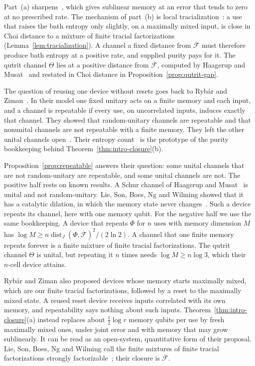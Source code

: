 Part~(a) sharpens~\cite[Corollary~3.3(c)]{DouglasMghirbiB}, which gives
sublinear memory at an error that tends to zero at no prescribed rate.
The mechanism of part~(b) is local
tracialization~\cite[Lemma~5.4]{DouglasMghirbiB}: a use that raises the
bath entropy only slightly, on a maximally mixed input, is close in
Choi distance to a mixture of finite tracial factorizations
(Lemma~\ref{lem:tracialization}). A channel a fixed distance from
$\overline{\mathcal F}$ must therefore produce bath entropy at a
positive rate, and supplied purity pays for it. The qutrit channel
$\Theta$ lies at a positive distance from $\overline{\mathcal F}$,
computed by Haagerup and Musat~\cite[Theorem~5.6 and
Corollary~5.7]{HaagerupMusat2015} and restated in Choi distance in
Proposition~\ref{prop:qutrit-gap}.

The question of reusing one device without resets goes back to Ryb\'ar
and Ziman~\cite{RybarZiman2008}. In their model one fixed unitary acts
on a finite memory and each input, and a channel is repeatable if every
use, on uncorrelated inputs, induces exactly that channel. They showed
that random-unitary channels are repeatable and that nonunital channels
are not repeatable with a finite memory. They left the other unital
channels open~\cite[Section~IV]{RybarZiman2008}. Their entropy
count~\cite[Equation~(3.7)]{RybarZiman2008} is the prototype of the
purity bookkeeping behind Theorem~\ref{thm:intro-closure}(b).

Proposition~\ref{prop:repeatable} answers their question: some unital
channels that are not random-unitary are repeatable, and some unital
channels are not. The positive half rests on known results. A Schur
channel of Haagerup and Musat~\cite[Example~3.3]{HaagerupMusat2011} is
unital and not random-unitary. Lie, Son, Boes, Ng and Wilming showed
that it has a catalytic dilation, in which the memory state never
changes~\cite[Proposition~15 and Appendix~C]{LieSonBoesNgWilming2026}.
Such a device repeats its channel, here with one memory qubit. For the
negative half we use the same bookkeeping. A device that repeats $\Phi$
for $n$ uses with memory dimension $M$ has
$\log M\geq n\operatorname{dist}_J(\Phi,\overline{\mathcal F})^2/(2\ln2)$.
A channel that one finite memory repeats forever is a finite mixture of
finite tracial factorizations. The qutrit channel $\Theta$ is unital, but
repeating it $n$ times needs $\log M\geq n\log3$, which their $n$-cell
device attains.

Ryb\'ar and Ziman also proposed devices whose memory starts maximally
mixed, which are our finite tracial factorizations, followed by a reset
to the maximally mixed state. A reused reset device receives inputs
correlated with its own memory, and repeatability says nothing about
such inputs. Theorem~\ref{thm:intro-closure}(a) instead replaces about
$\frac12\log r$ memory qubits per use by fresh maximally mixed ones,
under joint error and with memory that may grow sublinearly. It can be
read as an open-system, quantitative form of their proposal. Lie, Son,
Boes, Ng and Wilming call the finite mixtures of finite tracial
factorizations strongly factorizable~\cite{LieSonBoesNgWilming2026};
their closure is $\overline{\mathcal F}$.

